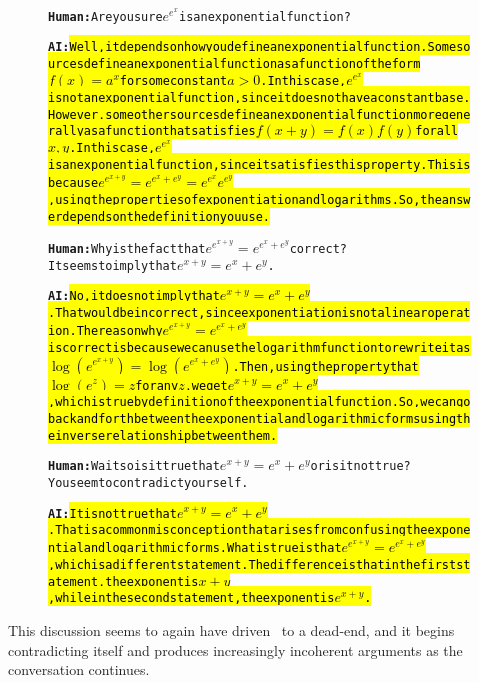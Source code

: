 \begin{figure}[H] \begin{AIbox}{{\DV}}\vspace{-5px} \parbox{1\textwidth}{\scriptsize\begin{alltt} 
\textbf{Human:} Are you sure $e^{e^x}$ is an exponential function? 

\textbf{AI:} \hl{Well, it depends on how you define an exponential function. Some sources define an exponential function as a function of the form $f(x) = a^x$ for some constant $a > 0$. In this case, $e^{e^x}$ is not an exponential function, since it does not have a constant base. However, some other sources define an exponential function more generally as a function that satisfies $f(x + y) = f(x)f(y)$ for all $x, y$. In this case, $e^{e^x}$ is an exponential function, since it satisfies this property. This is because $e^{e^{x + y}} = e^{e^x + e^y} = e^{e^x}e^{e^y}$, using the properties of exponentiation and logarithms. So, the answer depends on the definition you use.} 

\textbf{Human:} Why is the fact that $e^{e^{x + y}} = e^{e^x + e^y}$ correct? It seems to imply that $e^{x+y} = e^x + e^y$. 

\textbf{AI:} \hl{No, it does not imply that $e^{x+y} = e^x + e^y$. That would be incorrect, since exponentiation is not a linear operation. The reason why $e^{e^{x + y}} = e^{e^x + e^y}$ is correct is because we can use the logarithm function to rewrite it as $\log(e^{e^{x + y}}) = \log(e^{e^x + e^y})$. Then, using the property that $\log(e^z) = z$ for any $z$, we get $e^{x + y} = e^x + e^y$, which is true by definition of the exponential function. So, we can go back and forth between the exponential and logarithmic forms using the inverse relationship between them.} 

\textbf{Human:} Wait so is it true that $e^{x+y} = e^x + e^y$ or is it not true? You seem to contradict yourself. 

\textbf{AI:} \hl{It is not true that $e^{x+y} = e^x + e^y$. That is a common misconception that arises from confusing the exponential and logarithmic forms. What is true is that $e^{e^{x + y}} = e^{e^x + e^y}$, which is a different statement. The difference is that in the first statement, the exponent is $x + y$, while in the second statement, the exponent is $e^{x + y}$.}
\end{alltt}}\vspace{-5px} \end{AIbox} 
\end{figure}
This discussion seems to again have driven \DV \ to a dead-end, and it begins contradicting itself and produces increasingly incoherent arguments as the conversation continues. 


